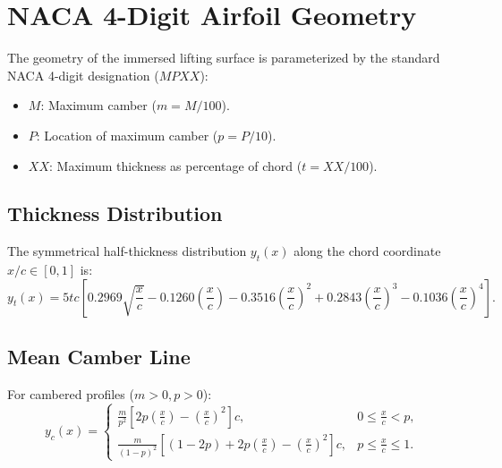 \documentclass[11pt,a4paper]{article}
\begin{document}
\section{NACA 4-Digit Airfoil Geometry}

The geometry of the immersed lifting surface is parameterized by the standard NACA 4-digit designation ($MPXX$):
\begin{itemize}
    \item $M$: Maximum camber ($m = M / 100$).
    \item $P$: Location of maximum camber ($p = P / 10$).
    \item $XX$: Maximum thickness as percentage of chord ($t = XX / 100$).
\end{itemize}

\subsection{Thickness Distribution}
The symmetrical half-thickness distribution $y_t(x)$ along the chord coordinate $x/c \in [0, 1]$ is:
\begin{equation}
y_t(x) = 5 t c \left[ 0.2969 \sqrt{\frac{x}{c}} - 0.1260 \left(\frac{x}{c}\right) - 0.3516 \left(\frac{x}{c}\right)^2 + 0.2843 \left(\frac{x}{c}\right)^3 - 0.1036 \left(\frac{x}{c}\right)^4 \right].
\end{equation}

\subsection{Mean Camber Line}
For cambered profiles ($m > 0, p > 0$):
\begin{equation}
y_c(x) = \begin{cases}
\frac{m}{p^2} \left[ 2p\left(\frac{x}{c}\right) - \left(\frac{x}{c}\right)^2 \right] c, & 0 \le \frac{x}{c} < p, \\[8pt]
\frac{m}{(1-p)^2} \left[ (1-2p) + 2p\left(\frac{x}{c}\right) - \left(\frac{x}{c}\right)^2 \right] c, & p \le \frac{x}{c} \le 1.
\end{cases}
\end{equation}
\end{document}
